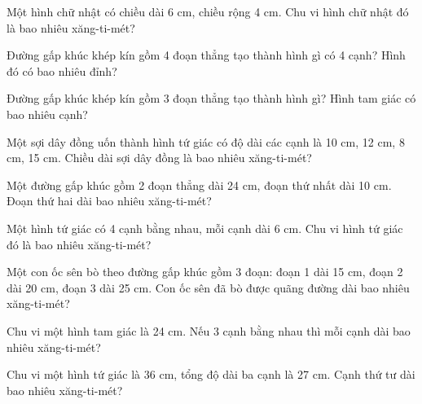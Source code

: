 \begin{ex}
Một hình chữ nhật có chiều dài 6 cm, chiều rộng 4 cm. Chu vi hình chữ nhật đó là bao nhiêu xăng-ti-mét?
\end{ex}

\begin{ex}
Đường gấp khúc khép kín gồm 4 đoạn thẳng tạo thành hình gì có 4 cạnh? Hình đó có bao nhiêu đỉnh?
\end{ex}

\begin{ex}
Đường gấp khúc khép kín gồm 3 đoạn thẳng tạo thành hình gì? Hình tam giác có bao nhiêu cạnh?
\end{ex}

\begin{ex}
Một sợi dây đồng uốn thành hình tứ giác có độ dài các cạnh là 10 cm, 12 cm, 8 cm, 15 cm. Chiều dài sợi dây đồng là bao nhiêu xăng-ti-mét?
\end{ex}

\begin{ex}
Một đường gấp khúc gồm 2 đoạn thẳng dài 24 cm, đoạn thứ nhất dài 10 cm. Đoạn thứ hai dài bao nhiêu xăng-ti-mét?
\end{ex}

\begin{ex}
Một hình tứ giác có 4 cạnh bằng nhau, mỗi cạnh dài 6 cm. Chu vi hình tứ giác đó là bao nhiêu xăng-ti-mét?
\end{ex}

\begin{ex}
Một con ốc sên bò theo đường gấp khúc gồm 3 đoạn: đoạn 1 dài 15 cm, đoạn 2 dài 20 cm, đoạn 3 dài 25 cm. Con ốc sên đã bò được quãng đường dài bao nhiêu xăng-ti-mét?
\end{ex}

\begin{ex}
Chu vi một hình tam giác là 24 cm. Nếu 3 cạnh bằng nhau thì mỗi cạnh dài bao nhiêu xăng-ti-mét?
\end{ex}

\begin{ex}
Chu vi một hình tứ giác là 36 cm, tổng độ dài ba cạnh là 27 cm. Cạnh thứ tư dài bao nhiêu xăng-ti-mét?
\end{ex}

